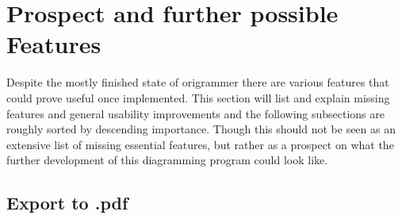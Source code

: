 
\section{Prospect and further possible Features}
\label{sec:prospect}

Despite the mostly finished state of \gls{origrammer} there are various features that could prove useful once implemented. This section will list and explain missing features and general usability improvements and the following subsections are roughly sorted by descending importance. Though this should not be seen as an extensive list of missing essential features, but rather as a prospect on what the further development of this diagramming program could look like. 

\subsection{Export to .pdf}
